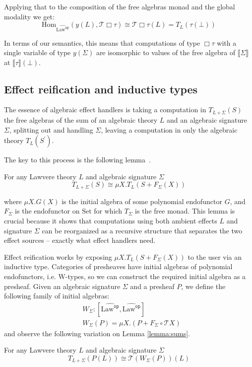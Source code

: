 \documentclass[acmsmall, screen, review, anonymous]{acmart}
\theoremstyle{definition}
\newcommand{\glob}{\mathop{\Box}}
\newcommand{\setc}{\mathrm{Set}}
\newcommand{\initial}{\bot}
\newcommand{\lawc}{\mathrm{Law}}
\newcommand{\lawcop}{\lawc^{\mathtt{op}}}
\newcommand{\pshlawcop}{\widehat{\lawcop}}
\newcommand{\yoneda}[1]{y(#1)}
\newcommand{\homset}[3]{\mathrm{Hom}_{#1}(#2, #3)}
\newcommand{\sem}[1]{\llbracket #1 \rrbracket}
\newcommand{\mon}{\mathcal{T}}
\newcommand{\ind}[1]{W_{#1}}
\newcommand{\types}{\mathrel{:}}
\begin{document}
Applying that to the composition of the free algebras monad and the
global modality we get:
\begin{equation*}
  \homset{\pshlawcop}{\yoneda{L}}{\mon{\glob \tau}} \cong \mon{\glob \tau}(L) = T_L(\tau(\initial))
\end{equation*}

In terms of our semantics, this means that computations of type
$\glob \tau$ with a single variable of type $\yoneda{\Sigma}$ are
isomorphic to values of the free algebra of $\sem{\Sigma}$ at
$\sem{\tau}(\initial)$.

\subsection{Effect reification and inductive types}

The essence of algebraic effect handlers is taking a computation in
$T_{L + \Sigma}(S)$ the free algebras of the sum of an algebraic theory
$L$ and an algebraic signature $\Sigma$, splitting out and handling
$\Sigma$, leaving a computation in only the algebraic theory
$T_{L}(S^\prime)$.

The key to this process is the following
lemma~\cite{hyland2006combining}.
\begin{lemma}
\label{lemma:sums}
  For any Lawvere theory $L$ and algebraic signature $\Sigma$
  \begin{equation*}
  T_{L + \Sigma}(S) \cong \mu X.T_L(S + F_\Sigma(X))
  \end{equation*}
\end{lemma}
where $\mu X.G(X)$ is the initial algebra of some polynomial endofunctor
$G$, and $F_\Sigma$ is the endofunctor on $\setc$ for which $T_{\Sigma}$
is the free monad. This lemma is crucial because it shows that
computations using both ambient effects $L$ and signature $\Sigma$ can
be reorganized as a recursive structure that separates the two effect
sources -- exactly what effect handlers need.

Effect reification works by exposing $\mu X.T_L(S + F_\Sigma(X))$ to the
user via an inductive type. Categories of presheaves have initial
algebras of polynomial endofunctors, i.e. W-types, so we can construct
the required initial algebra as a presheaf. Given an algebraic
signature $\Sigma$ and a presheaf $P$, we define the following family
of initial algebras:
\begin{align*}
&\ind{\Sigma} \types [\pshlawcop, \pshlawcop] \\
&\ind{\Sigma}(P) = \mu X. (P + F_\Sigma \circ \mon{X})
\end{align*}
and observe the following variation on Lemma \ref{lemma:sums}.
\begin{lemma}
\label{lemma:sums2}
  For any Lawvere theory $L$ and algebraic signature $\Sigma$
  \begin{equation*}
  T_{L + \Sigma}(P(L)) \cong \mon{(\ind{\Sigma}(P))}(L)
  \end{equation*}
\end{lemma}
\end{document}
